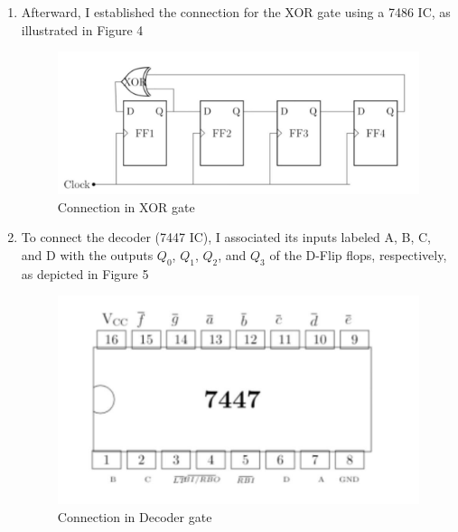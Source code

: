 \documentclass[journal,12pt,twocolumn]{IEEEtran}
\begin{document}
\begin{enumerate}
	\item Afterward, I established the connection for the XOR gate using a 7486 IC, as illustrated in Figure 4
	\begin{figure}[h]
	\begin{center}
		\includegraphics[width=\linewidth]{images/circuit_connections.jpg}
		\caption{Connection in XOR gate}
		\label{XOR}
		\end{center}
	\end{figure}

	\item To connect the decoder (7447 IC), I associated its inputs labeled A, B, C, and D with the outputs $Q_0$, $Q_1$, $Q_2$, and $Q_3$ of the D-Flip flops, respectively, as depicted in Figure 5
	\begin{figure}[h]
	\begin{center}
		\includegraphics[width=\linewidth]{images/7447.jpg}
		\caption{Connection in Decoder gate}
		\label{7447}
		\end{center}
	\end{figure}
		

\end{enumerate}
\end{document}
